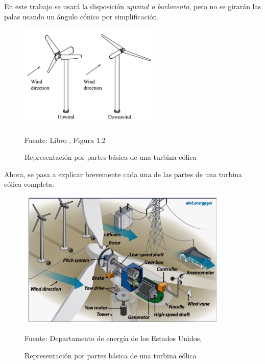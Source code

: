 En este trabajo se usará la disposición \textit{upwind o barlovento}, pero no se girarán las palas usando un ángulo cónico por simplificación.

\begin{figure}[H] 
    \centering
    \includegraphics[width=0.6\textwidth]{images/barlovento y sotavento.PNG}
    \caption{Representación por partes básica de una turbina eólica}
    Fuente: Libro \cite{manwell2010wind}, Figura 1.2
    \label{fig:barlovento_sotavento}
\end{figure}

Ahora, se pasa a explicar brevemente cada una de las partes de una turbina eólica completa:

\begin{figure}[H] 
    \centering
    \includegraphics[width=0.9\textwidth]{images/windTurbinebasics.png}
    \caption{Representación por partes básica de una turbina eólica}
    Fuente: Departamento de energía de los Estados Unidos, \cite{usgov}
    \label{fig:pala_explicar_partes}
\end{figure}

